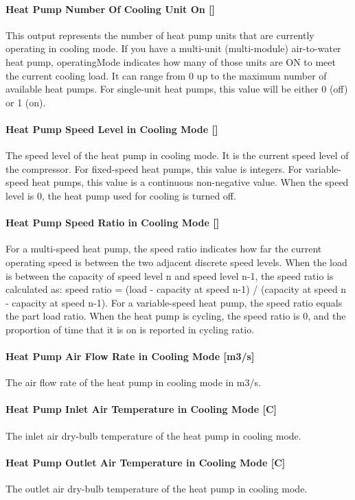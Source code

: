 \paragraph{Heat Pump Number Of Cooling Unit On {[}{]}}
This output represents the number of heat pump units that are currently operating
in cooling mode. If you have a multi-unit (multi-module) air-to-water heat pump,
operatingMode indicates how many of those units are ON to meet the current cooling load.
It can range from 0 up to the maximum number of available heat pumps. For single-unit heat pumps,
this value will be either 0 (off) or 1 (on).
\paragraph{Heat Pump Speed Level in Cooling Mode {[}{]}} The speed level of the
heat pump in cooling mode. It is the current speed level of the compressor. For
fixed-speed heat pumps, this value is integers. For variable-speed heat pumps,
this value is a continuous non-negative value. When the speed level is 0,
the heat pump used for cooling is turned off.
\paragraph{Heat Pump Speed Ratio in Cooling Mode {[}{]}} For a multi-speed heat pump, the speed ratio
indicates how far the current operating speed is between the two adjacent discrete speed levels.
When the load is between the capacity of speed level n and speed level n-1, the speed ratio is calculated as:
speed ratio = (load - capacity at speed n-1) / (capacity at speed n - capacity at speed n-1).
For a variable-speed heat pump, the speed ratio equals the part load ratio.
When the heat pump is cycling, the speed ratio is 0, and the proportion of time that it is on is reported in cycling ratio.
\paragraph{Heat Pump Air Flow Rate in Cooling Mode {[}m3/s{]}}
The air flow rate of the heat pump in cooling mode in m3/s.
\paragraph{Heat Pump Inlet Air Temperature in Cooling Mode {[}C{]}}
The inlet air dry-bulb temperature of the heat pump in cooling mode.
\paragraph{Heat Pump Outlet Air Temperature in Cooling Mode {[}C{]}}
The outlet air dry-bulb temperature of the heat pump in cooling mode.
